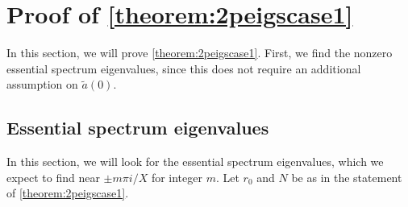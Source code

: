 \documentclass[thesis.tex]{subfiles}
\begin{document}
\section{Proof of \cref{theorem:2peigscase1}}

In this section, we will prove \cref{theorem:2peigscase1}. First, we find the nonzero essential spectrum eigenvalues, since this does not require an additional assumption on $\tilde{a}(0)$.

\subsection{Essential spectrum eigenvalues}

In this section, we will look for the essential spectrum eigenvalues, which we expect to find near $\pm m \pi i/X$ for integer $m$. Let $r_0$ and $N$ be as in the statement of \cref{theorem:2peigscase1}. 
\end{document}
